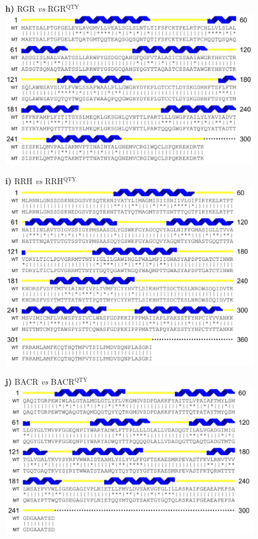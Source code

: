 \documentclass[fleqn,12pt]{supp}
\begin{document}
\newpage
\begin{figure}[H]
    \textbf{h)} RGR \textit{vs} RGR$^{\textrm{QTY}}$ \\
    \includegraphics[width=\linewidth]{SuppFigures/rgr.jpg}
\end{figure}

\newpage
\begin{figure}[H]
    \textbf{i)} RRH \textit{vs} RRH$^{\textrm{QTY}}$ \\
    \includegraphics[width=\linewidth]{SuppFigures/rrh.jpg}
\end{figure}

\newpage
\begin{figure}[H]
    \textbf{j)} BACR \textit{vs} BACR$^{\textrm{QTY}}$ \\
    \includegraphics[width=\linewidth]{SuppFigures/bacr.jpg}
\end{figure}
\end{document}
